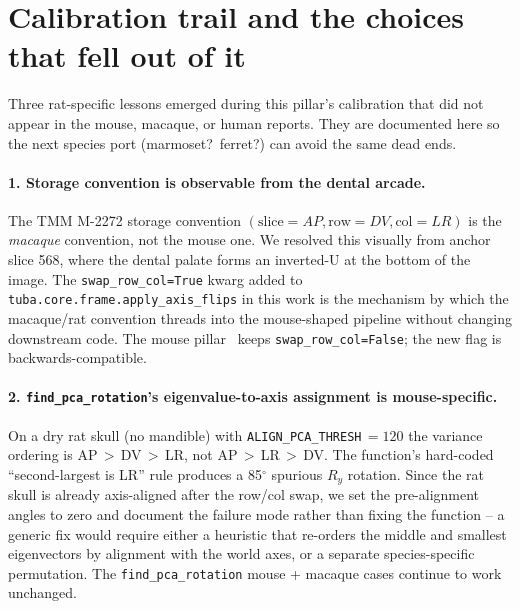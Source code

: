\documentclass{compactarticle}
\begin{document}
\section{Calibration trail and the choices that fell out of it}
\label{sec:lessons-rat}

Three rat-specific lessons emerged during this pillar's calibration
that did not appear in the mouse, macaque, or human reports. They
are documented here so the next species port (marmoset?\ ferret?)
can avoid the same dead ends.

\paragraph{1. Storage convention is observable from the dental
arcade.} The TMM M-2272 storage convention
$(\mathrm{slice}{=}AP, \mathrm{row}{=}DV, \mathrm{col}{=}LR)$ is the
\emph{macaque} convention, not the mouse one. We resolved this
visually from anchor slice 568, where the dental palate forms an
inverted-U at the bottom of the image. The
\texttt{swap\_row\_col=True} kwarg added to
\texttt{tuba.core.frame.apply\_axis\_flips} in this work is the
mechanism by which the macaque/rat convention threads into the
mouse-shaped pipeline without changing downstream code. The mouse
pillar~\cite{tuba-mouse} keeps \texttt{swap\_row\_col=False}; the
new flag is backwards-compatible.

\paragraph{2. \texttt{find\_pca\_rotation}'s eigenvalue-to-axis
assignment is mouse-specific.} On a dry rat skull (no mandible)
with \texttt{ALIGN\_PCA\_THRESH}\,$=120$ the variance ordering is
AP\,$>$\,DV\,$>$\,LR, not AP\,$>$\,LR\,$>$\,DV. The function's
hard-coded ``second-largest is LR'' rule produces a 85$^\circ$
spurious $R_y$ rotation. Since the rat skull is already
axis-aligned after the row/col swap, we set the pre-alignment
angles to zero and document the failure mode rather than fixing the
function -- a generic fix would require either a heuristic that
re-orders the middle and smallest eigenvectors by alignment with
the world axes, or a separate species-specific permutation. The
\texttt{find\_pca\_rotation} mouse + macaque cases continue to work
unchanged.
\end{document}
